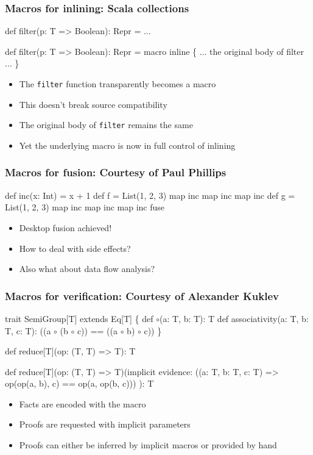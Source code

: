 \documentclass[svgnames,hyperref={bookmarks=false}]{beamer}
\begin{document}
\begin{frame}[fragile]
\frametitle{Macros for inlining: Scala collections}
\begin{semiverbatim}
def filter(p: T => Boolean): Repr = ...

def filter(p: T => Boolean): Repr = macro inline \{
  ... the original body of filter ...
\}

\end{semiverbatim}

\begin{itemize}
\item The \texttt{filter} function transparently becomes a macro
\item This doesn't break source compatibility
\item The original body of \texttt{filter} remains the same
\item Yet the underlying macro is now in full control of inlining
\end{itemize}
\end{frame}

\begin{frame}[fragile]
\frametitle{Macros for fusion: Courtesy of Paul Phillips}
\begin{semiverbatim}
def inc(x: Int) = x + 1
def f = List(1, 2, 3) map inc map inc map inc
def g = List(1, 2, 3) map inc map inc map inc fuse

\end{semiverbatim}

\begin{itemize}
\item Desktop fusion achieved!
\item How to deal with side effects?
\item Also what about data flow analysis?
\end{itemize}
\end{frame}

\begin{frame}[fragile]
\frametitle{Macros for verification: Courtesy of Alexander Kuklev}
\begin{semiverbatim}
trait SemiGroup[T] extends Eq[T] \{
  def \ensuremath{\circ}(a: T, b: T): T
  def associativity(a: T, b: T, c: T):
    ((a \ensuremath{\circ} (b \ensuremath{\circ} c)) == ((a \ensuremath{\circ} b) \ensuremath{\circ} c))
\}

def reduce[T](op: (T, T) => T): T

def reduce[T](op: (T, T) => T)(implicit evidence:
  ((a: T, b: T, c: T) => op(op(a, b), c) == op(a, op(b, c)))
): T
\end{semiverbatim}

\begin{itemize}
\item Facts are encoded with the  macro
\item Proofs are requested with implicit parameters
\item Proofs can either be inferred by implicit macros or provided by hand
\end{itemize}
\end{frame}
\end{document}
